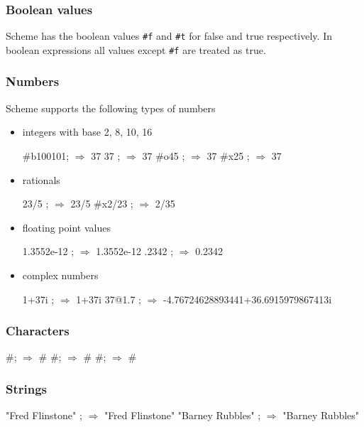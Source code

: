 \documentclass[12pt,a4paper,english,twoside]{article}
\begin{document}
\subsubsection{Boolean values}
Scheme has the boolean values \texttt{\#f} and \texttt{\#t} for false and true 
respectively. In boolean expressions all values except \texttt{\#f} are treated 
as true.
\subsubsection{Numbers}
Scheme supports the following types of numbers
\begin{itemize}
\item integers with base 2, 8, 10, 16
\begin{schemecode}
#b100101; $\Rightarrow$ 37
37 ; $\Rightarrow$ 37
#o45 ; $\Rightarrow$ 37
#x25 ; $\Rightarrow$ 37
\end{schemecode}
\item rationals
\begin{schemecode}
23/5 ; $\Rightarrow$ 23/5
#x2/23 ; $\Rightarrow$ 2/35
\end{schemecode}
\item floating point values
\begin{schemecode}
1.3552e-12 ; $\Rightarrow$ 1.3552e-12 
.2342 ; $\Rightarrow$ 0.2342
\end{schemecode}
\item complex numbers
\begin{schemecode}
1+37i ; $\Rightarrow$ 1+37i
37@1.7 ; $\Rightarrow$ -4.76724628893441+36.6915979867413i
\end{schemecode}
\end{itemize}
\subsubsection{Characters}
\begin{schemecode}
#\a ; $\Rightarrow$ #\a
#\newline ; $\Rightarrow$ #\newline
#\Z ; $\Rightarrow$ #\Z
\end{schemecode}
\subsubsection{Strings}
\begin{schemecode}
"Fred Flinstone" ; $\Rightarrow$ "Fred Flinstone"    
"Barney Rubbles" ; $\Rightarrow$ "Barney Rubbles"
\end{schemecode}
\end{document}
